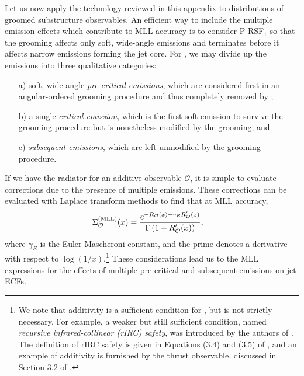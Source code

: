 Let us now apply the technology reviewed in this appendix to distributions of  groomed substructure observables.
%
An efficient way to include the multiple emission effects which contribute to MLL accuracy is to consider P-RSF\(_1\) so that the grooming affects only soft, wide-angle emissions and terminates before it affects narrow emissions forming the jet core.
%
For , we may divide up the emissions into three qualitative categories:

\begin{enumerate}
    \item[a)]
    soft, wide angle \textit{pre-critical emissions}, which are considered first in an angular-ordered grooming procedure and thus completely removed by ;

    \item[b)]
    a single \textit{critical emission}, which is the first soft emission to survive the grooming procedure but is nonetheless modified by the grooming; and

    \item[c)]
    \textit{subsequent emissions}, which are left unmodified by the grooming procedure.
\end{enumerate}

If we have the radiator for an additive observable \(\mathcal O\), it is simple to evaluate corrections due to the presence of multiple emissions.
%
These corrections can be evaluated with Laplace transform methods \cite{Banfi:2004yd} to find that at MLL accuracy,
%
\begin{align}
    \Sigma^{\rm (MLL)}_{\mathcal O}(x)
    &=
   \frac{
   e^{-R_{\mathcal O}(x)
   -
   \gamma_E R'_{\mathcal O}(x)}
   }
   {\Gamma
   \left(1 + R'_{\mathcal O}(x)\right)
   }
   \label{eqn:mll_general_dist}
   ,
\end{align}
%
where \(\gamma_E\) is the Euler-Mascheroni constant, and the prime denotes a derivative with respect to \(\log(1/x)\).\footnote{
We note that additivity is a sufficient condition for , but is not strictly necessary.
%
For example, a weaker but still sufficient condition, named \textit{recursive infrared-collinear (rIRC) safety}, was introduced by the authors of .
%
The definition of rIRC safety is given in Equations (3.4) and (3.5) of , and an example of additivity is furnished by the thrust observable, discussed in Section 3.2 of .
}
%
%
These considerations lead us to the MLL expressions for the effects of multiple pre-critical and subsequent emissions on jet ECFs.


